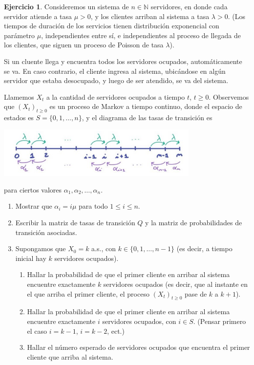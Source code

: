 \documentclass{article}
\newcommand{\naturalnum}{\mathbb{N}}
\theoremstyle{definition}
\newtheorem{exercise}{Ejercicio}
\begin{document}
\begingroup
\newcommand{\markovProcess}{(X_t)_{t \geq 0}}
\newcommand{\stateSpace}{S}

\begin{exercise}
Consideremos un sistema de $n \in \naturalnum$ servidores, en donde cada servidor atiende a tasa $\mu > 0$, y los clientes arriban al sistema a tasa $\lambda > 0$.
(Los tiempos de duración de los servicios tienen distribución exponencial con parámetro $\mu$, independientes entre sí, e independientes al proceso de llegada de los clientes, que siguen un proceso de Poisson de tasa $\lambda$).

Si un cluente llega y encuentra todos los servidores ocupados, automáticamente se va.
En caso contrario, el cliente ingresa al sistema, ubicándose en algún servidor que estaba desocupado, y luego de ser atendido, se va del sistema.

Llamemos $X_t$ a la cantidad de servidores ocupados a tiempo $t$, $t \geq 0$.
Observemos que $\markovProcess$ es un proceso de Markov a tiempo continuo, donde el espacio de estados es $\stateSpace = \{0, 1, \dots, n\}$, y el diagrama de las tasas de transición es
\begin{center}
\includegraphics[width=0.75\textwidth]{diagrama_de_las_tasas_de_transicion}
\end{center}
para ciertos valores $\alpha_1, \alpha_2, \dots, \alpha_n$.
\begin{enumerate}
	\item Mostrar que \(\alpha_i = i \mu\) para todo \(1 \leq i \leq n\).
	\item Escribir la matriz de tasas de transición \(Q\) y la matriz de probabilidades de transición asociadas.
	\item Supongamos que \(X_0 = k\) a.s., con \(k \in \{0, 1, \dots, n - 1\}\) (es decir, a tiempo inicial hay \(k\) servidores ocupados).
	\begin{enumerate}[label=\roman*.]
		\item Hallar la probabilidad de que el primer cliente en arribar al sistema encuentre exactamente $k$ servidores ocupados (es decir, que al instante en el que arriba el primer cliente, el proceso $\markovProcess$ pase de $k$ a $k + 1$).
		\item Hallar la probabilidad de que el primer cliente en arribar al sistema encuentre exactamente $i$ servidores ocupados, con $i \in S$.
	(Pensar primero el caso $i = k - 1$, $i = k - 2$, ect.)
		\item Hallar el número esperado de servidores ocupados que encuentra el primer cliente que arriba al sistema.
	\end{enumerate}
\end{enumerate}
\end{exercise}
\end{document}
